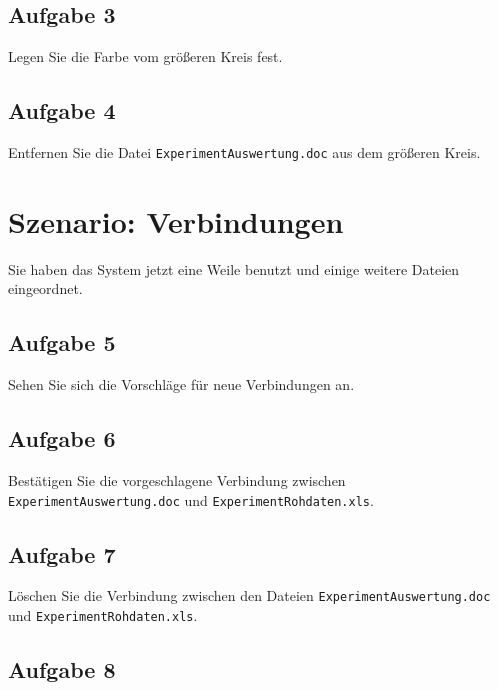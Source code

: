 \documentclass[12pt,]{article}
\begin{document}
\newpage

\subsection{Aufgabe 3}

Legen Sie die Farbe vom größeren Kreis fest.

\newpage

\subsection{Aufgabe 4}

Entfernen Sie die Datei \texttt{ExperimentAuswertung.doc} aus dem
größeren Kreis.

\newpage

\section{Szenario: Verbindungen}

Sie haben das System jetzt eine Weile benutzt und einige weitere Dateien
eingeordnet.

\subsection{Aufgabe 5}

Sehen Sie sich die Vorschläge für neue Verbindungen an.

\newpage

\subsection{Aufgabe 6}

Bestätigen Sie die vorgeschlagene Verbindung zwischen
\texttt{ExperimentAuswertung.doc} und \texttt{ExperimentRohdaten.xls}.

\newpage

\subsection{Aufgabe 7}

Löschen Sie die Verbindung zwischen den Dateien
\texttt{ExperimentAuswertung.doc} und \texttt{ExperimentRohdaten.xls}.

\newpage

\subsection{Aufgabe 8}
\end{document}
